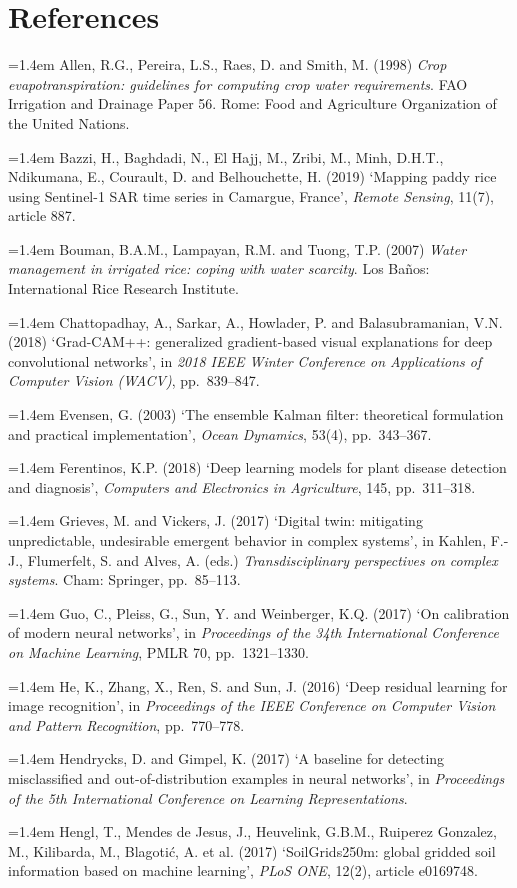 \documentclass[11pt,a4paper]{article}
\newcommand{\refitem}[1]{\par\noindent\hangindent=1.4em\hangafter=1 #1\par}
\begin{document}
\section*{References}
\refitem{Allen, R.G., Pereira, L.S., Raes, D. and Smith, M. (1998) \textit{Crop evapotranspiration: guidelines for computing crop water requirements}. FAO Irrigation and Drainage Paper 56. Rome: Food and Agriculture Organization of the United Nations.}
\refitem{Bazzi, H., Baghdadi, N., El Hajj, M., Zribi, M., Minh, D.H.T., Ndikumana, E., Courault, D. and Belhouchette, H. (2019) `Mapping paddy rice using Sentinel-1 SAR time series in Camargue, France', \textit{Remote Sensing}, 11(7), article 887.}
\refitem{Bouman, B.A.M., Lampayan, R.M. and Tuong, T.P. (2007) \textit{Water management in irrigated rice: coping with water scarcity}. Los Baños: International Rice Research Institute.}
\refitem{Chattopadhay, A., Sarkar, A., Howlader, P. and Balasubramanian, V.N. (2018) `Grad-CAM++: generalized gradient-based visual explanations for deep convolutional networks', in \textit{2018 IEEE Winter Conference on Applications of Computer Vision (WACV)}, pp.\ 839--847.}
\refitem{Evensen, G. (2003) `The ensemble Kalman filter: theoretical formulation and practical implementation', \textit{Ocean Dynamics}, 53(4), pp.\ 343--367.}
\refitem{Ferentinos, K.P. (2018) `Deep learning models for plant disease detection and diagnosis', \textit{Computers and Electronics in Agriculture}, 145, pp.\ 311--318.}
\refitem{Grieves, M. and Vickers, J. (2017) `Digital twin: mitigating unpredictable, undesirable emergent behavior in complex systems', in Kahlen, F.-J., Flumerfelt, S. and Alves, A. (eds.) \textit{Transdisciplinary perspectives on complex systems}. Cham: Springer, pp.\ 85--113.}
\refitem{Guo, C., Pleiss, G., Sun, Y. and Weinberger, K.Q. (2017) `On calibration of modern neural networks', in \textit{Proceedings of the 34th International Conference on Machine Learning}, PMLR 70, pp.\ 1321--1330.}
\refitem{He, K., Zhang, X., Ren, S. and Sun, J. (2016) `Deep residual learning for image recognition', in \textit{Proceedings of the IEEE Conference on Computer Vision and Pattern Recognition}, pp.\ 770--778.}
\refitem{Hendrycks, D. and Gimpel, K. (2017) `A baseline for detecting misclassified and out-of-distribution examples in neural networks', in \textit{Proceedings of the 5th International Conference on Learning Representations}.}
\refitem{Hengl, T., Mendes de Jesus, J., Heuvelink, G.B.M., Ruiperez Gonzalez, M., Kilibarda, M., Blagoti\'{c}, A. et al. (2017) `SoilGrids250m: global gridded soil information based on machine learning', \textit{PLoS ONE}, 12(2), article e0169748.}
\end{document}
